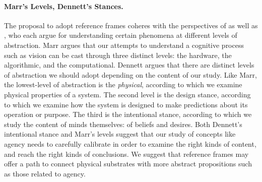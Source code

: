 \documentclass[11pt]{article} %
\begin{document}
\paragraph{Marr's Levels, Dennett's Stances.} The proposal to adopt reference frames coheres with the perspectives of \cite{dennett1989intentional} as well as \cite{marr2010vision}, who each argue for understanding certain phenomena at different levels of abstraction. 
%
Marr argues that our attempts to understand a cognitive process such as vision can be cast through three distinct levels: the hardware, the algorithmic, and the computational. 
%
Dennett argues that there are distinct levels of abstraction we should adopt depending on the content of our study. Like Marr, the lowest-level of abstraction is the \textit{physical}, according to which we examine physical properties of a system. The second level is the design stance, according to which we examine how the system is designed to make predictions about its operation or purpose. The third is the intentional stance, according to which we study the content of minds themselves: of beliefs and desires.  %
%
Both Dennett's intentional stance and Marr's levels suggest that our study of concepts like agency needs to carefully calibrate in order to examine the right kinds of content, and reach the right kinds of conclusions. %
%
%
We suggest that reference frames may offer a path to connect physical substrates with more abstract propositions such as those related to agency. 





\end{document}
